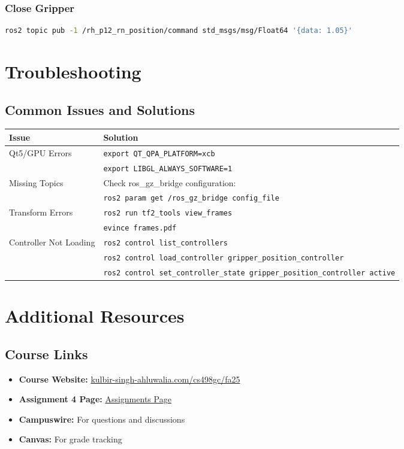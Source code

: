\documentclass[11pt,a4paper]{article}
\begin{document}
\subsubsection{Close Gripper}
\begin{lstlisting}[language=bash]
ros2 topic pub -1 /rh_p12_rn_position/command std_msgs/msg/Float64 '{data: 1.05}'
\end{lstlisting}

\section{Troubleshooting}

\subsection{Common Issues and Solutions}

\begin{table}[h!]
\centering
\begin{tabularx}{\textwidth}{lX}
\toprule
\textbf{Issue} & \textbf{Solution} \\
\midrule
Qt5/GPU Errors & \texttt{export QT\_QPA\_PLATFORM=xcb}\\
& \texttt{export LIBGL\_ALWAYS\_SOFTWARE=1} \\
\midrule
Missing Topics & Check ros\_gz\_bridge configuration:\\
& \texttt{ros2 param get /ros\_gz\_bridge config\_file} \\
\midrule
Transform Errors & \texttt{ros2 run tf2\_tools view\_frames}\\
& \texttt{evince frames.pdf} \\
\midrule
Controller Not Loading & \texttt{ros2 control list\_controllers}\\
& \texttt{ros2 control load\_controller gripper\_position\_controller}\\
& \texttt{ros2 control set\_controller\_state gripper\_position\_controller active} \\
\bottomrule
\end{tabularx}
\end{table}

\section{Additional Resources}

\subsection{Course Links}
\begin{itemize}
    \item \textbf{Course Website:} \href{https://kulbir-singh-ahluwalia.com/cs498gc/fa25/}{kulbir-singh-ahluwalia.com/cs498gc/fa25}
    \item \textbf{Assignment 4 Page:} \href{https://kulbir-singh-ahluwalia.com/cs498gc/fa25/assignments.html}{Assignments Page}
    \item \textbf{Campuswire:} For questions and discussions
    \item \textbf{Canvas:} For grade tracking
\end{itemize}
\end{document}

